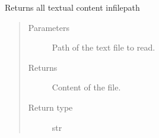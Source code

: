 \documentclass[letterpaper,10pt,english]{sphinxmanual}
\begin{document}
\begin{fulllineitems}
\label{\detokenize{code:code_utils.utils.get_file_id_and_content}}
Returns all textual content in\textasciigrave{}filepath\textasciigrave{}
\begin{quote}\begin{description}
\item[{Parameters}] \leavevmode
{} \textendash{} Path of the text file to read.

\item[{Returns}] \leavevmode
Content of the file.

\item[{Return type}] \leavevmode
str

\end{description}\end{quote}

\end{fulllineitems}

\end{document}
